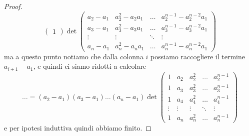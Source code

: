 \documentclass[11pt]{scrartcl}
\begin{document}
\begin{proof}
$$\begin{pmatrix}
   	 		1
   	 	\end{pmatrix}\det\begin{pmatrix}
   	 	a_2-a_1 & a_2^2-a_2a_1 & \dots & a_2^{n-1}-a_2^{n-2}a_1 \\
   	 	a_3-a_1 & a_3^2-a_3a_1 & \dots & a_3^{n-1}-a_3^{n-2}a_1 \\
   	 	\vdots & \vdots & \ddots & \vdots \\
   	 	a_n-a_1 & a_n^2-a_na_1 & \dots & a_n^{n-1}-a_n^{n-2}a_1
   	 	\end{pmatrix}$$
   	 	ma a questo punto notiamo che dalla colonna $i$ possiamo raccogliere il termine $a_{i+1}-a_1$, e quindi ci siamo ridotti a calcolare 
   	 	$$\dots=(a_2-a_1)(a_3-a_1)\dots (a_n-a_1)\det\begin{pmatrix}
   	 		1 & a_2 & a_2^2 & \dots & a_2^{n-1} \\
   	 		1 & a_3 & a_3^2 & \dots & a_3^{n-1} \\
   	 		1 & a_4 & a_4^2 & \dots & a_4^{n-1} \\
   	 		\vdots & \vdots & \vdots & \ddots & \vdots \\
   	 		1 & a_n & a_n^2 & \dots & a_n^{n-1}
   	 	\end{pmatrix}$$
   	 	e per ipotesi induttiva quindi abbiamo finito.
   	 \end{proof}
\end{document}

